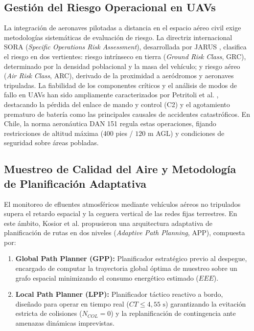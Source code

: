 \documentclass[letterpaper,12pt]{article}
\begin{document}
\subsection{Gestión del Riesgo Operacional en UAVs}

La integración de aeronaves pilotadas a distancia en el espacio aéreo civil exige metodologías sistemáticas de evaluación de riesgo. La directriz internacional SORA (\textit{Specific Operations Risk Assessment}), desarrollada por JARUS \cite{sora}, clasifica el riesgo en dos vertientes: riesgo intrínseco en tierra (\textit{Ground Risk Class}, GRC), determinado por la densidad poblacional y la masa del vehículo; y riesgo aéreo (\textit{Air Risk Class}, ARC), derivado de la proximidad a aeródromos y aeronaves tripuladas. La fiabilidad de los componentes críticos y el análisis de modos de fallo en UAVs han sido ampliamente caracterizados por Petritoli et al. \cite{petritoli}, destacando la pérdida del enlace de mando y control (C2) y el agotamiento prematuro de batería como las principales causales de accidentes catastróficos. En Chile, la norma aeronáutica DAN 151 \cite{dan151} regula estas operaciones, fijando restricciones de altitud máxima (400 pies / $120\text{ m}$ AGL) y condiciones de seguridad sobre áreas pobladas.

\subsection{Muestreo de Calidad del Aire y Metodología de Planificación Adaptativa}

El monitoreo de efluentes atmosféricos mediante vehículos aéreos no tripulados supera el retardo espacial y la ceguera vertical de las redes fijas terrestres. En este ámbito, Kosior et al. \cite{kosior} propusieron una arquitectura adaptativa de planificación de rutas en dos niveles (\textit{Adaptive Path Planning}, APP), compuesta por:
\begin{enumerate}
    \item \textbf{Global Path Planner (GPP):} Planificador estratégico previo al despegue, encargado de computar la trayectoria global óptima de muestreo sobre un grafo espacial minimizando el consumo energético estimado ($EEE$).
    \item \textbf{Local Path Planner (LPP):} Planificador táctico reactivo a bordo, diseñado para operar en tiempo real ($CT \le 4{,}55\text{ s}$) garantizando la evitación estricta de colisiones ($N_{COL} = 0$) y la replanificación de contingencia ante amenazas dinámicas imprevistas.
\end{enumerate}
\end{document}
